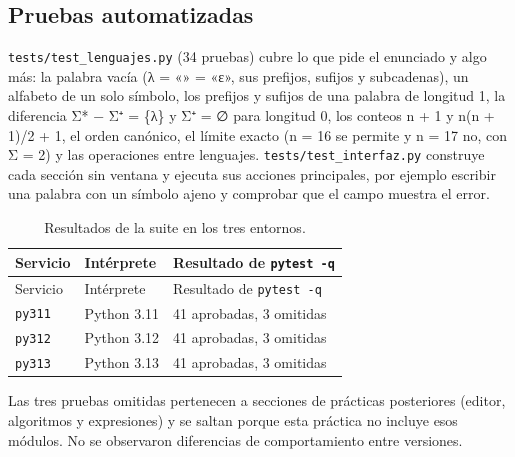 


\hypertarget{pruebas-automatizadas}{%
\subsection{Pruebas automatizadas}\label{pruebas-automatizadas}}

\texttt{tests/test\_lenguajes.py} (34 pruebas) cubre lo que pide el enunciado y algo más: la palabra vacía (λ = «» = «ε», sus prefijos, sufijos y subcadenas), un alfabeto de un solo símbolo, los prefijos y sufijos de una palabra de longitud 1, la diferencia Σ* − Σ⁺ = \{λ\} y Σ⁺ = ∅ para longitud 0, los conteos n + 1 y n(n + 1)/2 + 1, el orden canónico, el límite exacto (n = 16 se permite y n = 17 no, con \textbar Σ\textbar{} = 2) y las operaciones entre lenguajes. \texttt{tests/test\_interfaz.py} construye cada sección sin ventana y ejecuta sus acciones principales, por ejemplo escribir una palabra con un símbolo ajeno y comprobar que el campo muestra el error.

\begin{longtable}[]{@{}lll@{}}
\caption{Resultados de la suite en los tres entornos.}\tabularnewline
\toprule\noalign{}
Servicio & Intérprete & Resultado de \texttt{pytest\ -q} \\
\midrule\noalign{}
\endfirsthead
\toprule\noalign{}
Servicio & Intérprete & Resultado de \texttt{pytest\ -q} \\
\midrule\noalign{}
\endhead
\bottomrule\noalign{}
\endlastfoot
\texttt{py311} & Python 3.11 & 41 aprobadas, 3 omitidas \\
\texttt{py312} & Python 3.12 & 41 aprobadas, 3 omitidas \\
\texttt{py313} & Python 3.13 & 41 aprobadas, 3 omitidas \\
\end{longtable}

Las tres pruebas omitidas pertenecen a secciones de prácticas posteriores (editor, algoritmos y expresiones) y se saltan porque esta práctica no incluye esos módulos. No se observaron diferencias de comportamiento entre versiones.



